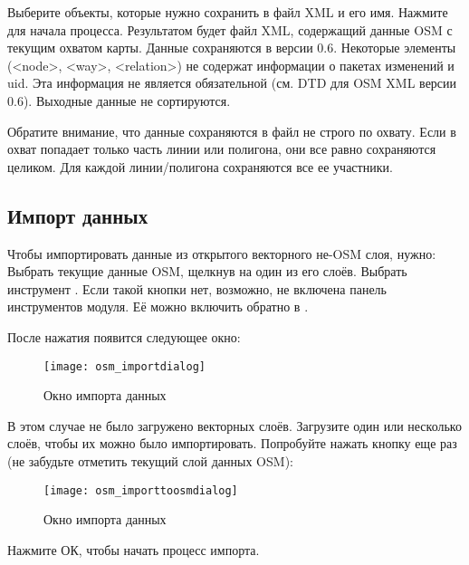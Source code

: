Выберите объекты, которые нужно сохранить в файл XML и его имя. Нажмите
 для начала процесса. Результатом будет файл XML, содержащий
данные OSM с текущим охватом карты. Данные сохраняются в версии 0.6.
Некоторые элементы (<node>, <way>, <relation>) не содержат информации о
пакетах изменений и uid. Эта информация не является обязательной (см.
DTD для OSM XML версии 0.6). Выходные данные не сортируются.

Обратите внимание, что данные сохраняются в файл не строго по охвату.
Если в охват попадает только часть линии или полигона, они все равно
сохраняются целиком. Для каждой линии/полигона сохраняются все ее
участники.

\subsection{Импорт данных}

Чтобы импортировать данные из открытого векторного не-OSM слоя, нужно:
Выбрать текущие данные OSM, щелкнув на один из его слоёв. Выбрать
инструмент . Если
такой кнопки нет, возможно, не включена панель инструментов модуля. Её
можно включить обратно в  \arrow {}
\arrow {}.

После нажатия появится следующее окно:

\begin{figure}[ht]
   \centering
   \texttt{[image: osm\_importdialog]}
   \caption{Окно импорта данных \wincaption}\label{fig:osmimportmessage}
\end{figure}

В этом случае не было загружено векторных слоёв. Загрузите один или
несколько слоёв, чтобы их можно было импортировать. Попробуйте нажать
кнопку еще раз (не забудьте отметить текущий слой данных OSM):

\begin{figure}[ht]
   \centering
   \texttt{[image: osm\_importtoosmdialog]}
   \caption{Окно импорта данных \wincaption}\label{fig:osmimporttoosm}
\end{figure}

Нажмите ОК, чтобы начать процесс импорта.

\FloatBarrier
